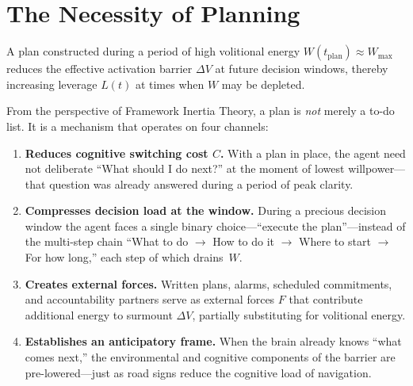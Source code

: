 \section{The Necessity of Planning}\label{sec:planning}

\begin{theorem}\label{thm:planning}
A plan constructed during a period of high volitional energy
$W(t_{\text{plan}}) \approx W_{\max}$ reduces the effective activation barrier
$\Delta V$ at future decision windows, thereby increasing leverage $L(t)$ at
times when $W$ may be depleted.
\end{theorem}

\begin{discussion}
From the perspective of Framework Inertia Theory, a plan is \emph{not} merely
a to-do list. It is a mechanism that operates on four channels:

\begin{enumerate}
  \item \textbf{Reduces cognitive switching cost $C$.} With a plan in place,
        the agent need not deliberate ``What should I do next?'' at the moment
        of lowest willpower---that question was already answered during a
        period of peak clarity.

  \item \textbf{Compresses decision load at the window.} During a precious
        decision window the agent faces a single binary choice---``execute the
        plan''---instead of the multi-step chain ``What to do $\to$ How to do
        it $\to$ Where to start $\to$ For how long,'' each step of which
        drains~$W$.

  \item \textbf{Creates external forces.} Written plans, alarms, scheduled
        commitments, and accountability partners serve as external forces $F$
        that contribute additional energy to surmount $\Delta V$, partially
        substituting for volitional energy.

  \item \textbf{Establishes an anticipatory frame.} When the brain already
        knows ``what comes next,'' the environmental and cognitive components
        of the barrier are pre-lowered---just as road signs reduce the
        cognitive load of navigation.
\end{enumerate}
\end{discussion}

